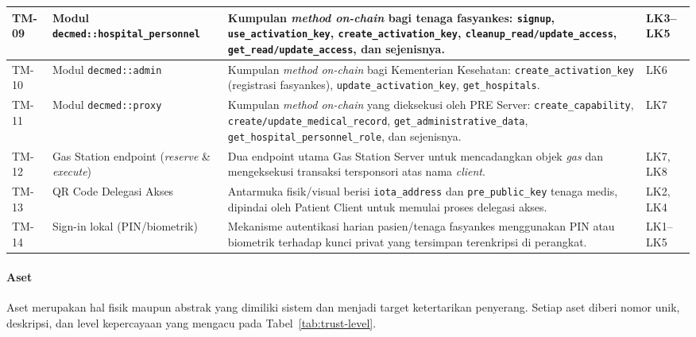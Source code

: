 \begin{xltabular}{\textwidth}{|>{\centering\arraybackslash}p{1.4cm}|>{\raggedright\arraybackslash}p{4.2cm}|X|>{\centering\arraybackslash}p{2cm}|}
    TM-09 & Modul \texttt{decmed::hospital\_personnel} & Kumpulan \textit{method on-chain} bagi tenaga fasyankes: \texttt{signup}, \texttt{use\_activation\_key}, \texttt{create\_activation\_key}, \texttt{cleanup\_read/update\_access}, \texttt{get\_read/update\_access}, dan sejenisnya. & LK3--LK5 \\
    \hline

    TM-10 & Modul \texttt{decmed::admin} & Kumpulan \textit{method on-chain} bagi Kementerian Kesehatan: \texttt{create\_activation\_key} (registrasi fasyankes), \texttt{update\_activation\_key}, \texttt{get\_hospitals}. & LK6 \\
    \hline

    TM-11 & Modul \texttt{decmed::proxy} & Kumpulan \textit{method on-chain} yang dieksekusi oleh PRE Server: \texttt{create\_capability}, \texttt{create/update\_medical\_record}, \texttt{get\_administrative\_data}, \texttt{get\_hospital\_personnel\_role}, dan sejenisnya. & LK7 \\
    \hline

    TM-12 & Gas Station endpoint (\textit{reserve} \& \textit{execute}) & Dua endpoint utama Gas Station Server untuk mencadangkan objek \textit{gas} dan mengeksekusi transaksi tersponsori atas nama \textit{client}. & LK7, LK8 \\
    \hline

    TM-13 & QR Code Delegasi Akses & Antarmuka fisik/visual berisi \texttt{iota\_address} dan \texttt{pre\_public\_key} tenaga medis, dipindai oleh Patient Client untuk memulai proses delegasi akses. & LK2, LK4 \\
    \hline

    TM-14 & Sign-in lokal (PIN/biometrik) & Mekanisme autentikasi harian pasien/tenaga fasyankes menggunakan PIN atau biometrik terhadap kunci privat yang tersimpan terenkripsi di perangkat. & LK1--LK5 \\
    \hline

\end{xltabular}

\paragraph{Aset}

Aset merupakan hal fisik maupun abstrak yang dimiliki sistem dan menjadi target ketertarikan penyerang. Setiap aset diberi nomor unik, deskripsi, dan level kepercayaan yang mengacu pada Tabel~\ref{tab:trust-level}.

